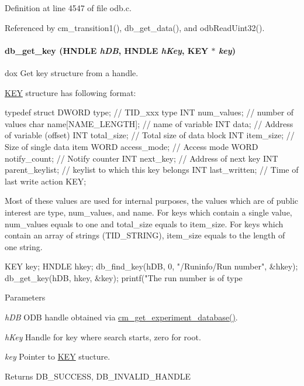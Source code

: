 Definition at line 4547 of file odb.c.

Referenced by cm\_\-transition1(), db\_\-get\_\-data(), and odbReadUint32().
\paragraph[{db\_\-get\_\-key}]{ db\_\-get\_\-key (HNDLE {\em hDB}, \/  HNDLE {\em hKey}, \/  {\bf KEY} $\ast$ {\em key})}\hfill\label{group__odbfunctionc_ga424ad3b166e3fba9bae29f7dfc74a369}
dox Get key structure from a handle.

\hyperlink{structKEY}{KEY} structure has following format: 
\begin{DoxyCode}
typedef struct {
  DWORD         type;                 // TID_xxx type
  INT           num_values;           // number of values
  char          name[NAME_LENGTH];    // name of variable
  INT           data;                 // Address of variable (offset)
  INT           total_size;           // Total size of data block
  INT           item_size;            // Size of single data item
  WORD          access_mode;          // Access mode
  WORD          notify_count;         // Notify counter
  INT           next_key;             // Address of next key
  INT           parent_keylist;       // keylist to which this key belongs
  INT           last_written;         // Time of last write action
} KEY;
\end{DoxyCode}
 Most of these values are used for internal purposes, the values which are of public interest are type, num\_\-values, and name. For keys which contain a single value, num\_\-values equals to one and total\_\-size equals to item\_\-size. For keys which contain an array of strings (TID\_\-STRING), item\_\-size equals to the length of one string. 
\begin{DoxyCode}
KEY   key;
HNDLE hkey;
db_find_key(hDB, 0, "/Runinfo/Run number", &hkey);
db_get_key(hDB, hkey, &key);
printf("The run number is of type %
\end{DoxyCode}
 
\begin{DoxyParams}{Parameters}
\item[{\em hDB}]ODB handle obtained via \hyperlink{group__cmfunctionc_ga16b33b70783a3f5ba98b4094149d12b7}{cm\_\-get\_\-experiment\_\-database()}. \item[{\em hKey}]Handle for key where search starts, zero for root. \item[{\em key}]Pointer to \hyperlink{structKEY}{KEY} stucture. \end{DoxyParams}
\begin{DoxyReturn}{Returns}
DB\_\-SUCCESS, DB\_\-INVALID\_\-HANDLE 
\end{DoxyReturn}


